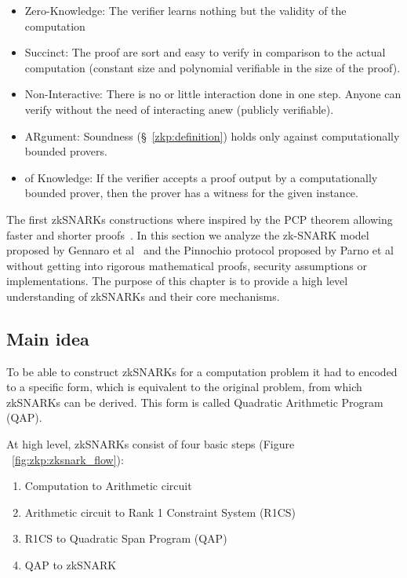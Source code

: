 \begin{itemize}
  \item Zero-Knowledge: The verifier learns nothing but the validity of the computation
  \item Succinct: The proof are sort and easy to verify in comparison to the actual computation (constant size and polynomial verifiable in the size of the proof).
  \item Non-Interactive: There is no or little interaction done in one step. Anyone can verify without the need of interacting anew (publicly verifiable).
  \item ARgument: Soundness (§~\ref{zkp:definition}) holds only against computationally bounded provers.
  \item of Knowledge: If the verifier accepts a proof output by a computationally bounded prover, then the prover has a witness for the given instance.
\end{itemize}

The first zkSNARKs constructions where inspired by the PCP theorem allowing faster and shorter proofs~\cite{zksnark_basics}. In this section we analyze the zk-SNARK model proposed by Gennaro et al~\cite{ggpr} and the Pinnochio protocol proposed by Parno et al~\cite{pinocchio-nearly-practical-verifiable-computation} without getting into rigorous mathematical proofs, security assumptions or implementations. The purpose of this chapter is to provide a high level understanding of zkSNARKs and their core mechanisms.

\subsection{Main idea}
\label{zkp:snarks:main_idea}

To be able to construct zkSNARKs for a computation problem it had to encoded to a specific form, which is equivalent to the original problem, from which zkSNARKs can be derived. This form is called Quadratic Arithmetic Program (QAP).

At high level, zkSNARKs consist of four basic steps (Figure ~\ref{fig:zkp:zksnark_flow}):

\begin{enumerate}
  \item Computation to Arithmetic circuit~\cite{pinocchio-nearly-practical-verifiable-computation}
  \item Arithmetic circuit to Rank 1 Constraint System (R1CS)~\cite{ggpr}
  \item R1CS to Quadratic Span Program (QAP)~\cite{ggpr}
  \item QAP to zkSNARK~\cite{pinocchio-nearly-practical-verifiable-computation}
\end{enumerate}

